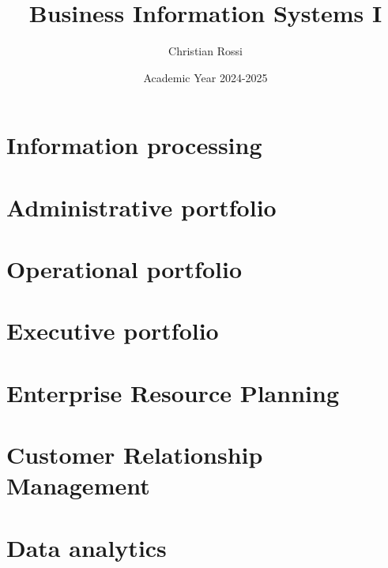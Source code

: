 \documentclass[12pt, a4paper]{report}
\title{\textbf{Business Information Systems I}}
\author{Christian Rossi}
\date{Academic Year 2024-2025}
\begin{document}
    \maketitle

    

    \cleardoublepage{}

    \tableofcontents

    \cleardoublepage{}

    \chapter{Information processing}
    
    
    
    
    

    \chapter{Administrative portfolio}
    

    \chapter{Operational portfolio}
    
    

    \chapter{Executive portfolio}
    
    
    

    \chapter{Enterprise Resource Planning}
    
    
    

    \chapter{Customer Relationship Management}

    \chapter{Data analytics}
    
    
\end{document}
